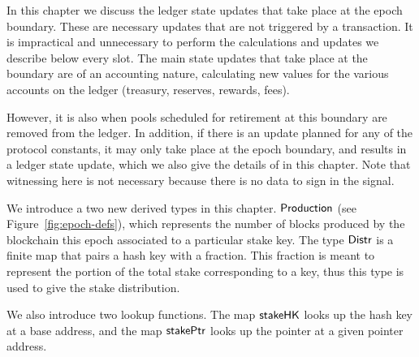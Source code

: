 \newcommand{\UTxOEpState}{\type{UTxOEpState}}
\newcommand{\Accnt}{\type{Accnt}}
\newcommand{\AccntEnv}{\type{AccntEnv}}
\newcommand{\AccntState}{\type{AccntState}}
\newcommand{\StPlCleanEnv}{\type{StPlCleanEnv}}
\newcommand{\StPlCleanState}{\type{StPlCleanState}}
\newcommand{\NewProtoConstsEnv}{\type{NewProtoConstsEnv}}
\newcommand{\NewProtoConstsState}{\type{NewProtoConstsState}}
\newcommand{\EpochEnv}{\type{EpochEnv}}
\newcommand{\EpochState}{\type{EpochState}}
\newcommand{\Production}{\type{Production}}
\newcommand{\Distr}{\type{Distr}}

\newcommand{\obligation}[4]{\fun{obligation}~ \var{#1}~ \var{#2}~ \var{#3}~ \var{#4}}
\newcommand{\reward}[5]{\fun{reward}~ \var{#1}~ \var{#2}~ \var{#3}~ \var{#4}~ \var{#5}}
\newcommand{\isActive}[4]{\fun{isActive}~ \var{#1}~ \var{#2}~ \var{#3}~ \var{#4}}
\newcommand{\activeStake}[5]{\fun{activeStake}~ \var{#1}~ \var{#2}~ \var{#3}~ \var{#4}~ \var{#5}}
\newcommand{\poolRefunds}[3]{\fun{poolRefunds}~ \var{#1}~ \var{#2}~ \var{#3}}

In this chapter we discuss the ledger state updates that take place at the epoch
boundary. These are necessary updates that are not triggered by a transaction.
It is impractical and unnecessary to perform the calculations and updates we
describe below every slot. The main state updates that take place at the boundary
are of an accounting nature, calculating new values for the various accounts
on the ledger (treasury, reserves, rewards, fees).

However, it is also when
pools scheduled for retirement at this boundary are removed from the ledger.
In addition, if there is an update planned for any of the protocol constants,
it may only take place at the epoch boundary, and results in a ledger state
update, which we also give the details of in this chapter.
Note that witnessing here is not necessary because there is no data to sign
in the signal.

We introduce a two new derived types in this chapter. $\Production$ (see
Figure~\ref{fig:epoch-defs}), which represents the number of blocks produced by
the blockchain this epoch associated to a particular stake key. The type
$\Distr$ is a finite map that pairs a hash key with a fraction. This fraction
is meant to represent the portion of the total stake corresponding to a key,
thus this type is used to give the stake distribution.

We also introduce two lookup functions. The map $\mathsf{stakeHK}$ looks up the
hash key at a base address, and the map $\mathsf{stakePtr}$ looks up the pointer
at a given pointer address.

